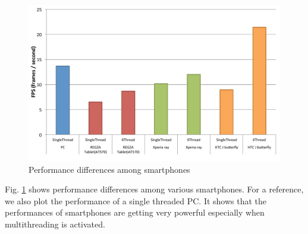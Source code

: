 \begin{figure}[!t]
 \centering
 \includegraphics[width=0.8\hsize]{fig/No14_Android_and_PC_benchmarck.pdf}
 \caption{Performance differences among smartphones}
 \label{fig:no14}
\end{figure}

Fig. \ref{fig:no14} shows performance differences among various
smartphones.
For a reference, we also plot the performance of a single threaded PC.
It shows that the performances of smartphones are getting very powerful
especially when multithreading is activated.